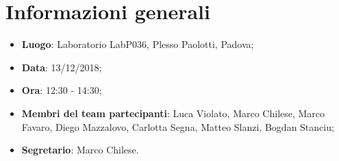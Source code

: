 \section{Informazioni generali}
\begin{itemize}
	\item \textbf{Luogo}: Laboratorio LabP036, Plesso Paolotti, Padova; 
	\item \textbf{Data}: 13/12/2018; 
	\item \textbf{Ora}: 12:30 - 14:30; 
	\item \textbf{Membri del team partecipanti}: Luca Violato, Marco Chilese, Marco Favaro, 
	Diego Mazzalovo, Carlotta Segna, Matteo Slanzi, Bogdan Stanciu; 
	\item \textbf{Segretario}: Marco Chilese. 
\end{itemize}






